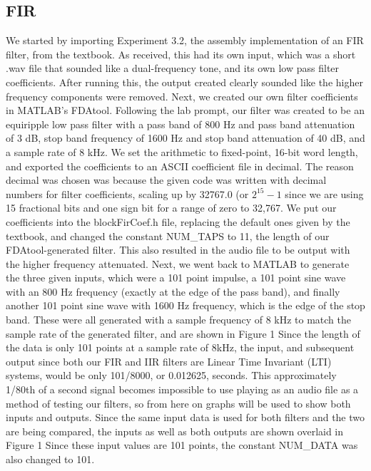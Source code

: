\documentclass{bannerReport}
\begin{document}
\subsection{FIR}
We started by importing Experiment 3.2, the assembly implementation of an FIR filter, from the textbook. As received, this had its own input, which was a short {\mono *.wav} file that sounded like a dual-frequency tone, and its own low pass filter coefficients. After running this, the output created clearly sounded like the higher frequency components were removed. Next, we created our own filter coefficients in MATLAB’s FDAtool. Following the lab prompt, our filter was created to be an equiripple low pass filter with a pass band of 800 Hz and pass band attenuation of 3 dB, stop band frequency of 1600 Hz and stop band attenuation of 40 dB, and a sample rate of 8 kHz. We set the arithmetic to fixed-point, 16-bit word length, and exported the coefficients to an ASCII coefficient file in decimal. The reason decimal was chosen was because the given code was written with decimal numbers for filter coefficients, scaling up by 32767.0 (or $2^{15} -1$ since we are using 15 fractional bits and one sign bit for a range of zero to 32,767. We put our coefficients into the {\mono blockFirCoef.h} file, replacing the default ones given by the textbook, and changed the constant {\mono NUM\_TAPS} to 11, the length of our FDAtool-generated filter. This also resulted in the audio file to be output with the higher frequency attenuated. Next, we went back to MATLAB to generate the three given inputs, which were a 101 point impulse, a 101 point sine wave with an 800 Hz frequency (exactly at the edge of the pass band), and finally another 101 point sine wave with 1600 Hz frequency, which is the edge of the stop band. These were all generated with a sample frequency of 8 kHz to match the sample rate of the generated filter, and are shown in Figure 1 Since the length of the data is only 101 points at a sample rate of 8kHz, the input, and subsequent output since both our FIR and IIR filters are Linear Time Invariant (LTI) systems, would be only 101/8000, or 0.012625, seconds. This approximately 1/80th of a second signal becomes impossible to use playing as an audio file as a method of testing our filters, so from here on graphs will be used to show both inputs and outputs. Since the same input data is used for both filters and the two are being compared, the inputs as well as both outputs are shown overlaid in Figure 1 Since these input values are 101 points, the constant {\mono NUM\_DATA} was also changed to 101.
\end{document}
